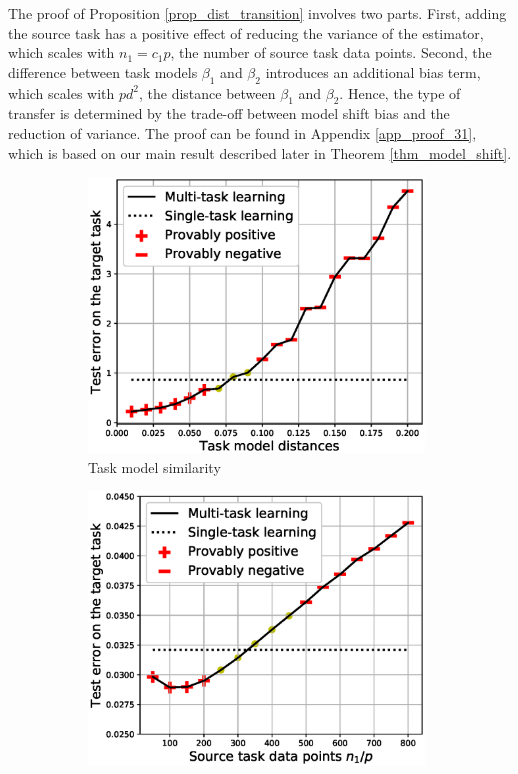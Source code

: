 The proof of Proposition \ref{prop_dist_transition} involves two parts.
First, adding the source task has a positive effect of reducing the variance of the estimator, which scales with $n_1 = c_1 p$, the number of source task data points.
Second, the difference between task models $\beta_1$ and $\beta_2$ introduces an additional bias term, which scales with $pd^2$, the distance between $\beta_1$ and $\beta_2$.
Hence, the type of transfer is determined by the trade-off between model shift bias and the reduction of variance.
The proof can be found in Appendix \ref{app_proof_31}, which is based on our main result described later in Theorem \ref{thm_model_shift}.

\begin{figure}
	\begin{subfigure}[b]{0.31\textwidth}
		\centering
		\includegraphics[width=0.98\textwidth]{figures/model_shift_phase_transition.eps}
		\caption{Task model similarity}
	\end{subfigure}\hfill
	\begin{subfigure}[b]{0.31\textwidth}
		\centering
		\includegraphics[width=0.98\textwidth]{figures/datapoints_phase_transition.eps}

\end{subfigure}
\end{figure}
